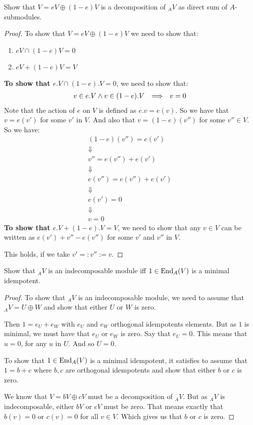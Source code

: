 \begin{prop}
Show that \(V=eV\oplus (1-e)V\) is a decomposition of \(_AV\) as direct sum of \(A\)-submodules.
\end{prop}

\begin{proof}
To show that \(V=eV\oplus (1-e)V\) we need to show that:

\begin{enumerate}
  \item \(eV \cap  (1-e)V =0\)
  \item \(eV + (1-e)V = V\)
\end{enumerate}

\textbf{To show that \(e.V \cap  (1-e).V =0\)}, we need to show that:
\begin{align*}
v\in e.V\space  \wedge  \space v\in (1-e).V && \Longrightarrow  &&v=0
\end{align*}
Note that the action of \(e\) on \(V\) is defined as \(e.v=e(v)\). So we have that
\(v=e(v')\) for some $v'$ in \(V\). And also that \(v=(1-e)(v'')\) for some $v''\in V$. So we have:
\begin{gather*}
(1-e)(v'')=e(v') \\
\Downarrow \\
v'' =e(v'')+e(v')\\
\Downarrow \\
e(v'')=e(v'')+e(v') \\
\Downarrow \\
e(v')=0 \\
\Downarrow \\
v=0
\end{gather*}
\textbf{To show that \(e.V+(1-e).V=V\)}, we need to show that any $v\in V$ can be written as \(e(v')+v''-e(v'')\) for some $v'$ and $v''$ in $V$.

This holds, if we take $v'=:v'':=v$.
\end{proof}


\begin{prop}
Show that $_AV$ is an indecomposable module iff $1\in \operatorname{End}_A(V)$ is a minimal idempotent.
\end{prop}

\begin{proof}
To show that \(_AV\) is an indecomposable module, we need to assume that
\(_AV=U\oplus W\) and show that either $U$ or $W$ is zero.

Then $1=e_U+e_W$ with $e_U$ and $e_W$ orthogonal idempotents elements. But as $1$ is minimal, we must have that $e_U$ or $e_W$ is zero. Say that $e_U=0$. This means that $u=0$, for any $u$ in $U$. And so $U=0$.

To show that $1\in  \operatorname{End}_A(V)$ is a minimal idempotent, it satisfies to assume that $1=b+c$ where $b,c$ are orthogonal idempotents and show that either $b$ or $c$ is zero.

We know that \(V=bV\oplus cV\) must be a decomposition of \(_AV\). But as \(_AV\) is indecomposable, either \(bV\) or \(cV\) must be zero. That means exactly that \(b(v)=0\) or \(c(v)=0\) for all \(v\in V\). Which gives us that \(b\) or \(c\) is zero.
\end{proof}

